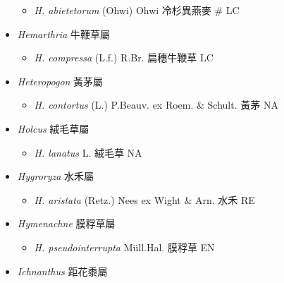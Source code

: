 \begin{itemize}
  \begin{itemize}
        \item[] \textit{H. abietetorum} (Ohwi) Ohwi  冷杉異燕麥  \# LC
  \end{itemize}
 \item[] \textit{Hemarthria} 牛鞭草屬
                                
  \begin{itemize}
        \item[] \textit{H. compressa} (L.f.) R.Br.  扁穗牛鞭草   LC
  \end{itemize}
 \item[] \textit{Heteropogon} 黃茅屬
                                
  \begin{itemize}
        \item[] \textit{H. contortus} (L.) P.Beauv. ex Roem. \& Schult.  黃茅   NA
  \end{itemize}
 \item[] \textit{Holcus} 絨毛草屬
                                
  \begin{itemize}
        \item[] \textit{H. lanatus} L.  絨毛草   NA
  \end{itemize}
 \item[] \textit{Hygroryza} 水禾屬
                                
  \begin{itemize}
        \item[] \textit{H. aristata} (Retz.) Nees ex Wight \& Arn.  水禾   RE
  \end{itemize}
 \item[] \textit{Hymenachne} 膜稃草屬
                                
  \begin{itemize}
        \item[] \textit{H. pseudointerrupta} Müll.Hal.  膜稃草   EN
  \end{itemize}
 \item[] \textit{Ichnanthus} 距花黍屬
                                

\end{itemize}
